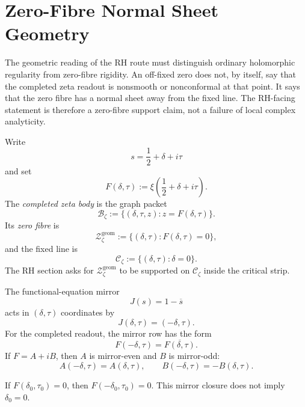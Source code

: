 \section{Zero-Fibre Normal Sheet Geometry}
\label{sec:unified-reality-zero-fibre-normal-sheet-geometry}

The geometric reading of the RH route must distinguish ordinary
holomorphic regularity from zero-fibre rigidity.  An off-fixed zero does
not, by itself, say that the completed zeta readout is nonsmooth or
nonconformal at that point.  It says that the zero fibre has a normal
sheet away from the fixed line.  The RH-facing statement is therefore a
zero-fibre support claim, not a failure of local complex analyticity.

\begin{definition}
\label{def:unified-reality-completed-zeta-body}
Write
$$
s=\frac12+\delta+i\tau
$$
and set
$$
F(\delta,\tau):=\xi\!\left(\frac12+\delta+i\tau\right).
$$
The \emph{completed zeta body} is the graph packet
$$
\mathcal B_{\zeta}
:=
\{(\delta,\tau,z):z=F(\delta,\tau)\}.
$$
Its \emph{zero fibre} is
$$
\mathcal Z_{\zeta}^{\mathrm{geom}}
:=
\{(\delta,\tau):F(\delta,\tau)=0\},
$$
and the fixed line is
$$
\mathcal C_{\zeta}
:=
\{(\delta,\tau):\delta=0\}.
$$
The RH section asks for $\mathcal Z_{\zeta}^{\mathrm{geom}}$ to be
supported on $\mathcal C_{\zeta}$ inside the critical strip.
\end{definition}

\begin{definition}
\label{def:unified-reality-mirror-coordinates}
The functional-equation mirror
$$
J(s)=1-\overline{s}
$$
acts in $(\delta,\tau)$ coordinates by
$$
J(\delta,\tau)=(-\delta,\tau).
$$
For the completed readout, the mirror row has the form
$$
F(-\delta,\tau)=\overline{F(\delta,\tau)}.
$$
If $F=A+iB$, then $A$ is mirror-even and $B$ is mirror-odd:
$$
A(-\delta,\tau)=A(\delta,\tau),
\qquad
B(-\delta,\tau)=-B(\delta,\tau).
$$
\end{definition}

\begin{theorem}
\label{thm:unified-reality-mirror-symmetry-gives-paired-zeros-not-rh}
If $F(\delta_0,\tau_0)=0$, then $F(-\delta_0,\tau_0)=0$.
This mirror closure does not imply $\delta_0=0$.
\end{theorem}

